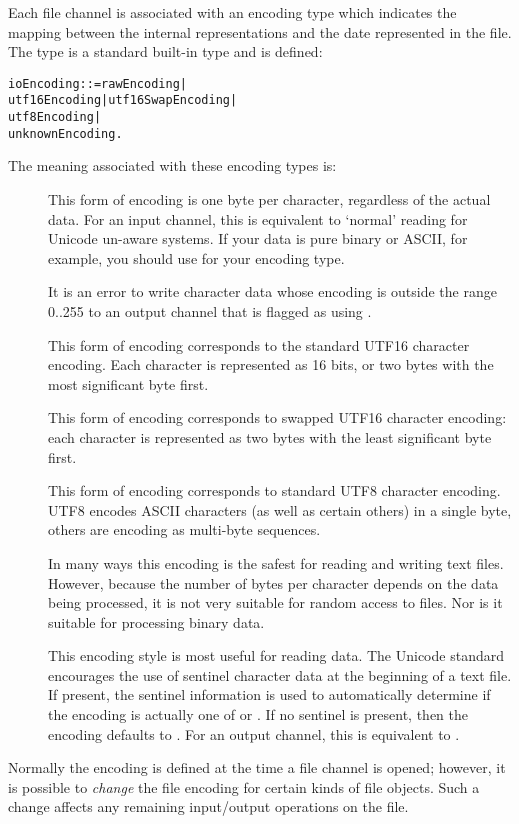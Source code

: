 Each file channel is associated with an encoding type which indicates the mapping between the internal representations and the date represented in the file. The  type is a standard built-in type and is defined:
\begin{alltt}
ioEncoding ::= rawEncoding | 
   utf16Encoding | utf16SwapEncoding |
   utf8Encoding |
   unknownEncoding.
\end{alltt}
The meaning associated with these encoding types is:
\begin{description}
\item[]
This form of encoding is one byte per character, regardless of the actual data. For an input channel, this is equivalent to `normal' reading for Unicode un-aware systems. If your data is pure binary or ASCII, for example, you should use  for your encoding type.

It is an error to write character data whose encoding is outside the range 0..255 to an output channel that is flagged as using .

\item[]
This form of encoding corresponds to the standard UTF16 character encoding. Each character is represented as 16 bits, or two bytes with the most significant byte first.
\item[]
This form of encoding corresponds to swapped UTF16 character encoding: each character is represented as two bytes with the least significant byte first.
\item[]
This form of encoding corresponds to standard UTF8 character encoding. UTF8 encodes ASCII characters (as well as certain others) in a single byte, others are encoding as multi-byte sequences.

In many ways this encoding is the safest for reading and writing text files. However, because the number of bytes per character depends on the data being processed, it is not very suitable for random access to files. Nor is it suitable for processing binary data.
\item[]
This encoding style is most useful for reading data. The Unicode standard encourages the use of sentinel character data at the beginning of a text file. If present, the sentinel information is used to automatically determine if the encoding is actually one of  or . If no sentinel is present, then the encoding defaults to . For an output channel, this is equivalent to .
\end{description}
Normally the encoding is defined at the time a file channel is opened; however, it is possible to \emph{change} the file encoding for certain kinds of file objects. Such a change affects any remaining input/output operations on the file.

